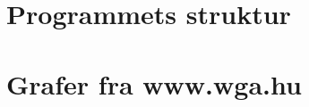 {

\chapter{Programmets struktur\label{appendix_struktur}}


\chapter{Grafer fra www.wga.hu\label{appendix_grafer}}


}

